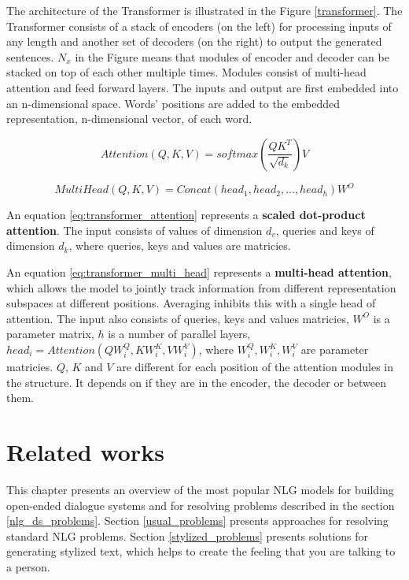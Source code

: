 The architecture of the Transformer is illustrated in the Figure \ref{transformer}. The Transformer consists of a stack of encoders (on the left) for processing inputs of any length and another set of decoders (on the right) to output the generated sentences. $N_x$ in the Figure means that modules of encoder and decoder can be stacked on top of each other multiple times. Modules consist of multi-head attention and feed forward layers. The inputs and output are first embedded into an n-dimensional space. Words' positions are added to the embedded representation, n-dimensional vector, of each word.

\begin{equation} \label{eq:transformer_attention}
Attention(Q, K, V) = softmax(\frac{QK^T}{\sqrt{d_k}})V
\end{equation}

\begin{equation} \label{eq:transformer_multi_head}
MultiHead(Q, K, V) = Concat(head_1, head_2, ..., head_h)W^O
\end{equation}

An equation \ref{eq:transformer_attention} represents a \textbf{scaled dot-product attention}. The input consists of values of dimension $d_v$, queries and keys of dimension $d_k$, where queries, keys and values are matricies.

An equation \ref{eq:transformer_multi_head} represents a \textbf{multi-head attention}, which allows the model to jointly track information from different representation subspaces at different positions. Averaging inhibits this with a single head of attention. The input also consists of queries, keys and values matricies, $W^O$ is a parameter matrix, $h$ is a number of parallel layers, $head_i = Attention(QW_i^Q, KW_i^K, VW_i^V)$, where $W_i^Q, W_i^K, W_i^V$ are parameter matricies. $Q$, $K$ and $V$ are different for each position of the attention modules in the structure. It depends on if they are in the encoder, the decoder or between them.


\chapter{Related works}
This chapter presents an overview of the most popular NLG models for building open-ended dialogue systems and for resolving problems described in the section \ref{nlg_ds_problems}. Section \ref{usual_problems} presents approaches for resolving standard NLG problems. Section \ref{stylized_problems} presents solutions for generating stylized text, which helps to create the feeling that you are talking to a person.

